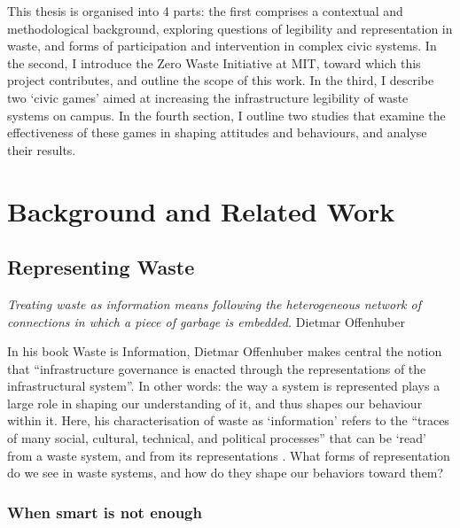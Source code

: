 \documentclass[nofonts,nols,justified,nobib]{tufte-book}
\begin{document}
This thesis is organised into 4 parts: the first comprises a contextual and methodological background, exploring questions of legibility and representation in waste, and forms of participation and intervention in complex civic systems. In the second, I introduce the Zero Waste Initiative at MIT, toward which this project contributes, and outline the scope of this work. In the third, I describe two `civic games' aimed at increasing the infrastructure legibility of waste systems on campus. In the fourth section, I outline two studies that examine the effectiveness of these games in shaping attitudes and behaviours, and analyse their results.

\chapter{Background and Related Work}


\section*{Representing Waste}

\begin{flushright}
\emph{Treating waste as information means following the heterogeneous network of connections in which a piece of garbage is embedded.} \cite{offenhuber_waste_2017}
Dietmar Offenhuber
\end{flushright}


In his book Waste is Information, Dietmar Offenhuber makes central the notion that ``infrastructure governance is enacted through the representations of the infrastructural system''. In other words: the way a system is represented plays a large role in shaping our understanding of it, and thus shapes our behaviour within it. Here, his characterisation of waste as `information' refers to the ``traces of many social, cultural, technical, and political processes'' that can be `read' from a waste system, and from its representations \cite{offenhuber_waste_2017}. What forms of representation do we see in waste systems, and how do they shape our behaviors toward them? 


\subsection*{When smart is not enough}
\end{document}

